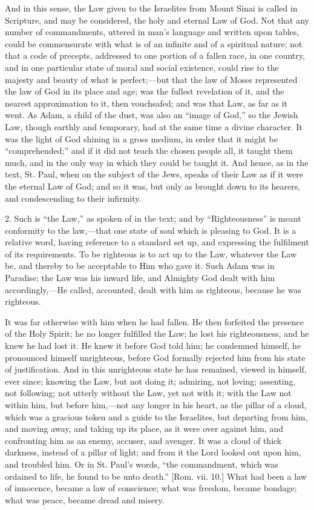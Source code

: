 And in this sense, the Law given to the Israelites from Mount Sinai
is called in Scripture, and may be considered, the holy and eternal
Law of God. Not that any number of commandments, uttered in man's
language and written upon tables, could be commensurate with what is
of an infinite and of a spiritual nature; not that a code of precepts,
addressed to one portion of a fallen race, in one country, and in one
particular state of moral and social existence, could rise to the
majesty and beauty of what is perfect;—but that the law of Moses
represented the law of God in its place and age; was the fullest
revelation of it, and the nearest approximation to it, then
vouchsafed; and was that Law, as far as it went. As Adam, a child of
the dust, was also an ``image of God,'' so the Jewish Law,
though earthly and temporary, had at the same time a divine character.
It was the light of God shining in a gross medium, in order that it
might be ``comprehended;'' and if it did not teach the chosen
people all, it taught them much, and in the only way in which they
could be taught it. And hence, as in the text, St. Paul, when on the
subject of the Jews, speaks of their Law as if it were the eternal Law
of God; and so it was, but only as brought down to its hearers, and
condescending to their infirmity.

2. Such is ``the Law,'' as spoken of in the text; and by
``Righteousness'' is meant conformity to the law,—that one
state of soul which is pleasing to God. It is a relative word, having
reference to a standard set up, and expressing the fulfilment of its
requirements. To be righteous is to act up to the Law, whatever the
Law be, and thereby to be acceptable to Him who gave it. Such Adam was
in Paradise; the Law was his inward life, and Almighty God dealt with
him accordingly,—He called, accounted, dealt with him as righteous,
because he was righteous.

It was far otherwise with him when he had fallen. He then forfeited
the presence of the Holy Spirit; he no longer fulfilled the Law; he
lost his righteousness, and he knew he had lost it. He knew it before
God told him; he condemned himself, he pronounced himself unrighteous,
before God formally rejected him from his state of justification. And
in this unrighteous state he has remained, viewed in himself, ever
since; knowing the Law, but not doing it; admiring, not loving;
assenting, not following; not utterly without the Law, yet not with
it; with the Law not within him, but before him,—not any longer in
his heart, as the pillar of a cloud, which was a gracious token and a
guide to the Israelites, but departing from him, and moving away, and
taking up its place, as it were over against him, and confronting him
as an enemy, accuser, and avenger. It was a cloud of thick darkness,
instead of a pillar of light; and from it the Lord looked out upon
him, and troubled him. Or in St. Paul's words, ``the commandment,
which was ordained to life, he found to be unto death.'' [Rom.
vii. 10.] What had been a law of innocence, became a law of
conscience; what was freedom, became bondage; what was peace, became
dread and misery.

